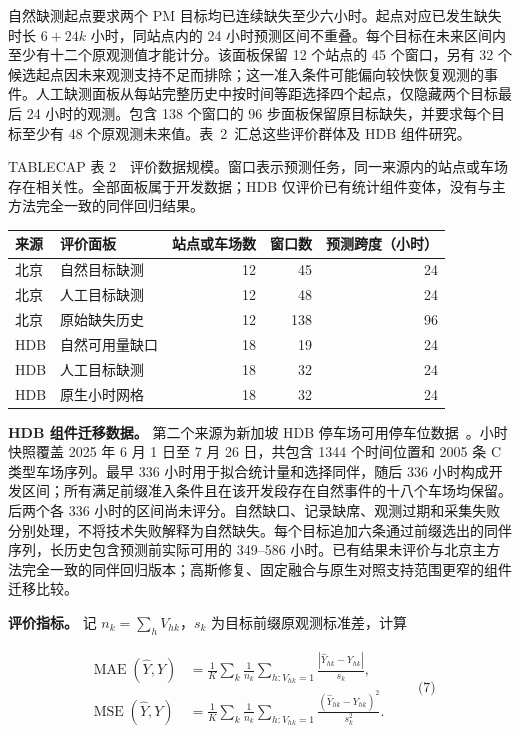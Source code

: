 自然缺测起点要求两个 PM 目标均已连续缺失至少六小时。起点对应已发生缺失时长 $6+24k$ 小时，同站点内的 24 小时预测区间不重叠。每个目标在未来区间内至少有十二个原观测值才能计分。该面板保留 12 个站点的 45 个窗口，另有 32 个候选起点因未来观测支持不足而排除；这一准入条件可能偏向较快恢复观测的事件。人工缺测面板从每站完整历史中按时间等距选择四个起点，仅隐藏两个目标最后 24 小时的观测。包含 138 个窗口的 96 步面板保留原目标缺失，并要求每个目标至少有 48 个原观测未来值。表~2~汇总这些评价群体及 HDB 组件研究。



TABLECAP 表 2　评价数据规模。窗口表示预测任务，同一来源内的站点或车场存在相关性。全部面板属于开发数据；HDB 仅评价已有统计组件变体，没有与主方法完全一致的同伴回归结果。

\begin{tabular}{llrrr}
\toprule
来源 & 评价面板 & 站点或车场数 & 窗口数 & 预测跨度（小时）\\
\midrule
北京 & 自然目标缺测 & 12 & 45 & 24\\
北京 & 人工目标缺测 & 12 & 48 & 24\\
北京 & 原始缺失历史 & 12 & 138 & 96\\
HDB & 自然可用量缺口 & 18 & 19 & 24\\
HDB & 人工目标缺测 & 18 & 32 & 24\\
HDB & 原生小时网格 & 18 & 32 & 24\\
\bottomrule
\end{tabular}



\textbf{HDB 组件迁移数据。}
第二个来源为新加坡 HDB 停车场可用停车位数据~\citep{hdbavailability}。小时快照覆盖 2025 年 6 月 1 日至 7 月 26 日，共包含 1344 个时间位置和 2005 条 C 类型车场序列。最早 336 小时用于拟合统计量和选择同伴，随后 336 小时构成开发区间；所有满足前缀准入条件且在该开发段存在自然事件的十八个车场均保留。后两个各 336 小时的区间尚未评分。自然缺口、记录缺席、观测过期和采集失败分别处理，不将技术失败解释为自然缺失。每个目标追加六条通过前缀选出的同伴序列，长历史包含预测前实际可用的 349--586 小时。已有结果未评价与北京主方法完全一致的同伴回归版本；高斯修复、固定融合与原生对照支持范围更窄的组件迁移比较。

\textbf{评价指标。}
记 $n_k=\sum_hV_{hk}$，$s_k$ 为目标前缀原观测标准差，计算


\[\begin{aligned}\operatorname{MAE}(\widehat Y,Y)&=\frac1K\sum_k\frac1{n_k}
   \sum_{h:V_{hk}=1}\frac{|\widehat Y_{hk}-Y_{hk}|}{s_k},\\
 \operatorname{MSE}(\widehat Y,Y)&=\frac1K\sum_k\frac1{n_k}
   \sum_{h:V_{hk}=1}\frac{(\widehat Y_{hk}-Y_{hk})^2}{s_k^2}.\end{aligned}\qquad\text{(7)}\]


